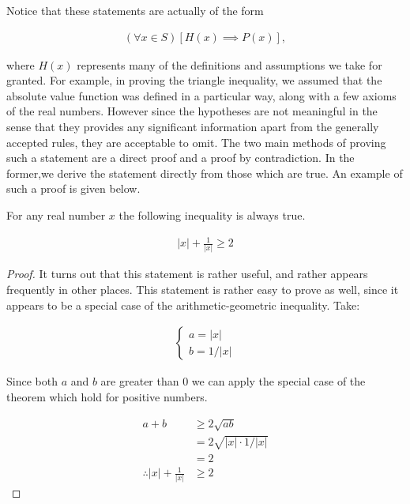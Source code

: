 \documentclass[twoside]{report}
\begin{document}
Notice that these statements are actually of the form

\begin{align*}
	(\forall x \in S)[H(x) \implies P(x)],
\end{align*}

where $H(x)$ represents many of the definitions and assumptions we take for granted. For example, in proving the triangle inequality, we assumed that the absolute value function was defined in a particular way, along with a few axioms of the real numbers. However since the hypotheses are not meaningful in the sense that they provides any significant information apart from the generally accepted rules, they are acceptable to omit. The two main methods of proving such a statement are a direct proof and a proof by contradiction. In the former,we derive the statement directly from those which are true. An example of such a proof is given below.

\vspace{\baselineskip}
\begin{theorem}
	For any real number $x$ the following inequality is always true.
	
	\begin{align}
		|x| + \frac{1}{|x|} \ge 2
	\end{align}
\end{theorem}

\begin{proof}
	It turns out that this statement is rather useful, and rather appears frequently in other places. This statement is rather easy to prove as well, since it appears to be a special case of the arithmetic-geometric inequality. Take:
	
	\begin{align*}
		\begin{cases}
			a = |x| \\
			b = 1 / |x|
		\end{cases}
	\end{align*}
		
	Since both $a$ and $b$ are greater than 0 we can apply the special case of the theorem which hold for positive numbers.
	
	\begin{align*}
		a + b &\ge 2 \sqrt{ab} \\
		&= 2 \sqrt{|x| \cdot 1 / |x|} \\
		&= 2 \\
		\therefore |x| + \frac{1}{|x|} &\ge 2
	\end{align*}
\end{proof}
\vspace{\baselineskip}
\end{document}
